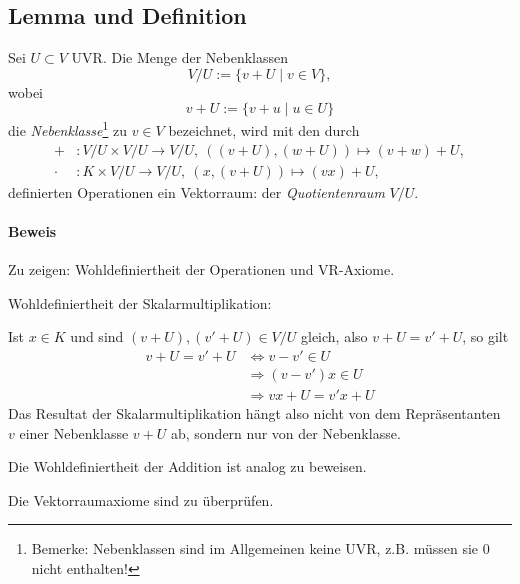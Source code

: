  \subsection{Lemma und Definition}
 	\begin{Definition}[Nebenklassen]
 		Sei $U\subset V$ UVR. Die Menge der Nebenklassen
 		\[
 			V/U := \{v+U\mid v\in V\},
 		\]
 		wobei
 		\[
 			v+U:=\{v+u\mid u\in U\}
 		\]
 		die \emph{Nebenklasse}\footnote{Bemerke: Nebenklassen sind im Allgemeinen keine UVR, z.B. müssen sie $0$ nicht enthalten!} zu $v\in V$ bezeichnet, wird mit den durch
 		\begin{align*}
 			+     & : V/U \times V/U \to V/U,\ ((v+U),(w+U))\mapsto (v+w)+U, \\
 			\cdot & : K\times V/U \to V/U,\ (x,(v+U))\mapsto (vx)+U,
 		\end{align*}
 		definierten Operationen ein Vektorraum: der \emph{Quotientenraum} $V/U$.
 	\end{Definition}

 	\paragraph{Beweis}
 		Zu zeigen: Wohldefiniertheit der Operationen und VR-Axiome.

 		Wohldefiniertheit der Skalarmultiplikation:

 		Ist $x\in K$ und sind $(v+U),(v'+U)\in V/U$ gleich, also $v+U = v'+U$, so gilt
 		\begin{align*}
 			v+U = v'+U & \Leftrightarrow v - v'\in U \\
 			           & \Rightarrow (v-v')x \in U   \\
 			           & \Rightarrow vx+U=v' x+U
 		\end{align*}
 		Das Resultat der Skalarmultiplikation hängt also nicht von dem Repräsentanten $v$ einer Nebenklasse $v+U$ ab, sondern nur von der Nebenklasse.

 		Die Wohldefiniertheit der Addition ist analog zu beweisen.

 		Die Vektorraumaxiome sind zu überprüfen.


